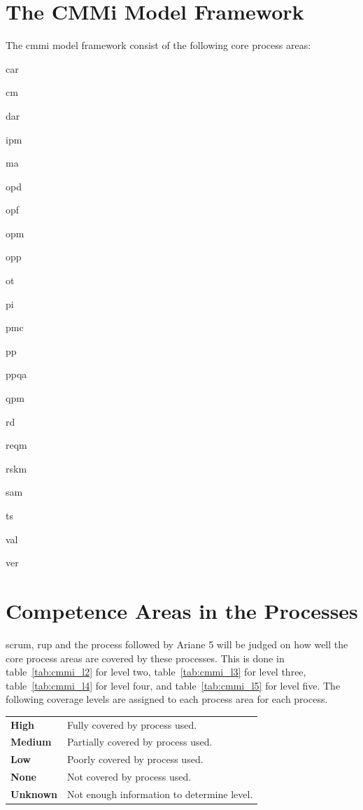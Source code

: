\section{The CMMi Model Framework}
The \ac{cmmi} model framework consist of the following core process areas:
\begin{compactitem}
    \item \ac{car}
    \item \ac{cm}
    \item \ac{dar}
    \item \ac{ipm}
    \item \ac{ma}
    \item \ac{opd}
    \item \ac{opf}
    \item \ac{opm}
    \item \ac{opp}
    \item \ac{ot}
    \item \ac{pi}
    \item \ac{pmc}
    \item \ac{pp}
    \item \ac{ppqa}
    \item \ac{qpm}
    \item \ac{rd}
    \item \ac{reqm}
    \item \ac{rskm}
    \item \ac{sam}
    \item \ac{ts}
    \item \ac{val}
    \item \ac{ver}
\end{compactitem}

\section{Competence Areas in the Processes}
\ac{scrum}, \ac{rup} and the process followed by Ariane 5 will be judged on how well the core process areas are covered by these processes. 
This is done in table~\ref{tab:cmmi_l2} for level two, table~\ref{tab:cmmi_l3} for level three, table~\ref{tab:cmmi_l4} for level four, and table~\ref{tab:cmmi_l5} for level five. The following coverage levels are assigned to each process area for each process.

\noindent
\begin{tabular}{>{\bfseries}L{0,15\textwidth}L{0,85\textwidth}}
    High    & Fully covered by process used.\\
    Medium  & Partially covered by process used.\\
    Low     & Poorly covered by process used.\\
    None    & Not covered by process used.\\
    Unknown & Not enough information to determine level.\\
\end{tabular}

